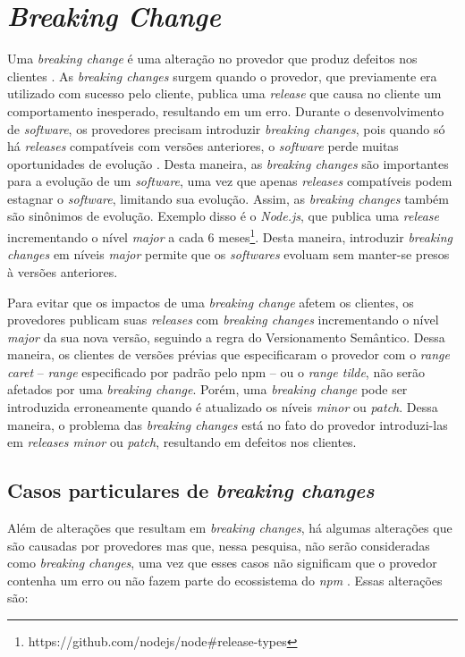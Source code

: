 \section{\textit{Breaking Change}}
\label{ref-teo:breaking_change}
Uma \textit{breaking change} é uma alteração no provedor que produz defeitos nos clientes \cite{teorical_reference:semver}. As \textit{breaking changes} surgem quando o provedor, que previamente era utilizado com sucesso pelo cliente, publica uma \textit{release} que causa no cliente um comportamento inesperado, resultando em um erro. Durante o desenvolvimento de \textit{software}, os provedores precisam introduzir \textit{breaking changes}, pois quando só há \textit{releases} compatíveis com versões anteriores, o \textit{software} perde muitas oportunidades de evolução \cite{teorical_reference:bc_2}. Desta maneira, as \textit{breaking changes} são importantes para a evolução de um \textit{software}, uma vez que apenas \textit{releases} compatíveis podem estagnar o \textit{software}, limitando sua evolução. Assim, as \textit{breaking changes} também são sinônimos de evolução. Exemplo disso é o \textit{Node.js}, que publica uma \textit{release} incrementando o nível \textit{major} a cada 6 meses\footnote{https://github.com/nodejs/node\#release-types}. Desta maneira, introduzir \textit{breaking changes} em níveis \textit{major} permite que os \textit{softwares} evoluam sem manter-se presos à versões anteriores.

Para evitar que os impactos de uma \textit{breaking change} afetem os clientes, os provedores publicam suas \textit{releases} com \textit{breaking changes} incrementando o nível \textit{major} da sua nova versão, seguindo a regra do Versionamento Semântico. Dessa maneira, os clientes de versões prévias que especificaram o provedor com o \textit{range caret} -- \textit{range} especificado por padrão pelo \gls{npm} -- ou o \textit{range tilde}, não serão afetados por uma \textit{breaking change}. Porém, uma \textit{breaking change} pode ser introduzida erroneamente quando é atualizado os níveis \textit{minor} ou \textit{patch}. Dessa maneira, o problema das \textit{breaking changes} está no fato do provedor introduzi-las em \textit{releases minor} ou \textit{patch}, resultando em defeitos nos clientes.

\subsection{Casos particulares de \textit{breaking changes}}
Além de alterações que resultam em \textit{breaking changes}, há algumas alterações que são causadas por provedores mas que, nessa pesquisa, não serão consideradas como \textit{breaking changes}, uma vez que esses casos não significam que o provedor contenha um erro ou não fazem parte do ecossistema do \textit{npm} . Essas alterações são:


